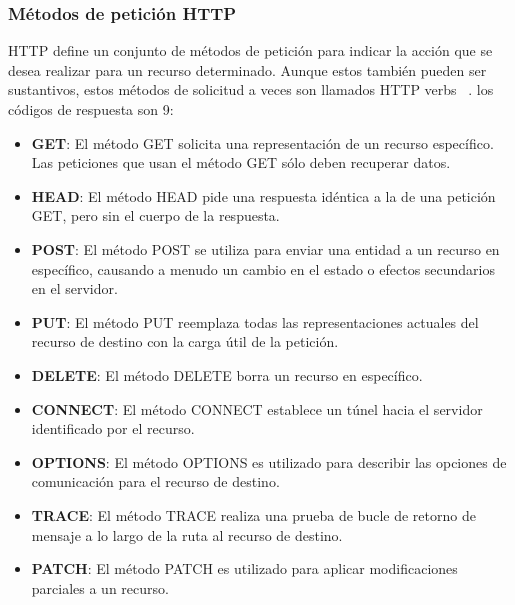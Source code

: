 \subsubsection{Métodos de petición HTTP}
HTTP define un conjunto de métodos de petición para indicar la acción que se desea realizar para un recurso determinado. Aunque estos también pueden ser sustantivos, estos métodos de solicitud a veces son llamados HTTP verbs ~\cite{HTTP-metodos-MDN}. los códigos de respuesta son 9:
\begin{itemize}
	\item \textbf{GET}: El método GET solicita una representación de un recurso específico. Las peticiones que usan el método GET sólo deben recuperar datos.
	
	\item \textbf{HEAD}: El método HEAD pide una respuesta idéntica a la de una petición GET, pero sin el cuerpo de la respuesta.
	
	\item \textbf{POST}: El método POST se utiliza para enviar una entidad a un recurso en específico, causando a menudo un cambio en el estado o efectos secundarios en el servidor.
	
	\item \textbf{PUT}: El método PUT reemplaza todas las representaciones actuales del recurso de destino con la carga útil de la petición.
	
	\item \textbf{DELETE}: El método DELETE borra un recurso en específico.
	
	\item \textbf{CONNECT}: El método CONNECT establece un túnel hacia el servidor identificado por el recurso.
	
	\item \textbf{OPTIONS}: El método OPTIONS es utilizado para describir las opciones de comunicación para el recurso de destino.
	
	\item \textbf{TRACE}: El método TRACE realiza una prueba de bucle de retorno de mensaje a lo largo de la ruta al recurso de destino.
	
	\item \textbf{PATCH}: El método PATCH es utilizado para aplicar modificaciones parciales a un recurso.
\end{itemize}

